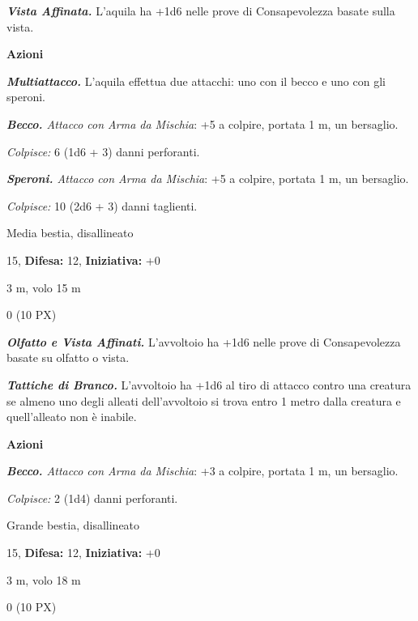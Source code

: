 \begin{multicols}{2}
{\emph{\textbf{Vista Affinata.}} L'aquila ha +1d6 nelle prove di Consapevolezza basate sulla vista.

\textbf{Azioni}

\emph{\textbf{Multiattacco.}} L'aquila effettua due attacchi: uno con il becco e uno con gli speroni.

\emph{\textbf{Becco.} Attacco con Arma da Mischia}: +5 a colpire, portata 1 m, un bersaglio.

\emph{Colpisce:} 6 (1d6 + 3) danni perforanti.

\emph{\textbf{Speroni.} Attacco con Arma da Mischia}: +5 a colpire, portata 1 m, un bersaglio.

\emph{Colpisce:} 10 (2d6 + 3) danni taglienti.

\begin{description}[noitemsep, topsep=0pt, parsep=0pt, partopsep=0pt, leftmargin=0cm, labelwidth=2.2cm]
	\item[\textbf{Taglia/Tipo:}] Media bestia, disallineato
	\item[\textbf{Caratt.:}] 
	\item[\textbf{Punti Ferita:}] 15,  \textbf{Difesa:} 12,  \textbf{Iniziativa:} +0
	\item[\textbf{Tiri Salvez.:}] 
	\item[\textbf{Movimento:}] 3 m, volo 15 m
	\item[\textbf{Sfida:}] 0 (10 PX)\smallskip
\end{description}

\emph{\textbf{Olfatto e Vista Affinati.}} L'avvoltoio ha +1d6 nelle prove di Consapevolezza basate su olfatto o vista.

\emph{\textbf{Tattiche di Branco.}} L'avvoltoio ha +1d6 al tiro di attacco contro una creatura se almeno uno degli alleati dell'avvoltoio si trova entro 1 metro dalla creatura e quell'alleato non è inabile.

\textbf{Azioni}

\emph{\textbf{Becco.} Attacco con Arma da Mischia}: +3 a colpire, portata 1 m, un bersaglio.

\emph{Colpisce:} 2 (1d4) danni perforanti.

\begin{description}[noitemsep, topsep=0pt, parsep=0pt, partopsep=0pt, leftmargin=0cm, labelwidth=2.2cm]
	\item[\textbf{Taglia/Tipo:}] Grande bestia, disallineato
	\item[\textbf{Caratt.:}] 
	\item[\textbf{Punti Ferita:}] 15,  \textbf{Difesa:} 12,  \textbf{Iniziativa:} +0
	\item[\textbf{Tiri Salvez.:}] 
	\item[\textbf{Movimento:}] 3 m, volo 18 m
	\item[\textbf{Sfida:}] 0 (10 PX)\smallskip
\end{description}

}
\end{multicols}
